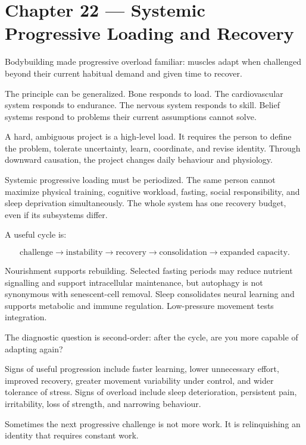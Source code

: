\chapter{Chapter 22 --- Systemic Progressive Loading and Recovery}\label{chapter-22-systemic-progressive-loading-and-recovery}

Bodybuilding made progressive overload familiar: muscles adapt when challenged beyond their current habitual demand and given time to recover.

The principle can be generalized. Bone responds to load. The cardiovascular system responds to endurance. The nervous system responds to skill. Belief systems respond to problems their current assumptions cannot solve.

A hard, ambiguous project is a high-level load. It requires the person to define the problem, tolerate uncertainty, learn, coordinate, and revise identity. Through downward causation, the project changes daily behaviour and physiology.

Systemic progressive loading must be periodized. The same person cannot maximize physical training, cognitive workload, fasting, social responsibility, and sleep deprivation simultaneously. The whole system has one recovery budget, even if its subsystems differ.

A useful cycle is:

\[
\text{challenge}\rightarrow\text{instability}\rightarrow\text{recovery}\rightarrow\text{consolidation}\rightarrow\text{expanded capacity}.
\]

Nourishment supports rebuilding. Selected fasting periods may reduce nutrient signalling and support intracellular maintenance, but autophagy is not synonymous with senescent-cell removal. Sleep consolidates neural learning and supports metabolic and immune regulation. Low-pressure movement tests integration.

The diagnostic question is second-order: after the cycle, are you more capable of adapting again?

Signs of useful progression include faster learning, lower unnecessary effort, improved recovery, greater movement variability under control, and wider tolerance of stress. Signs of overload include sleep deterioration, persistent pain, irritability, loss of strength, and narrowing behaviour.

Sometimes the next progressive challenge is not more work. It is relinquishing an identity that requires constant work.
